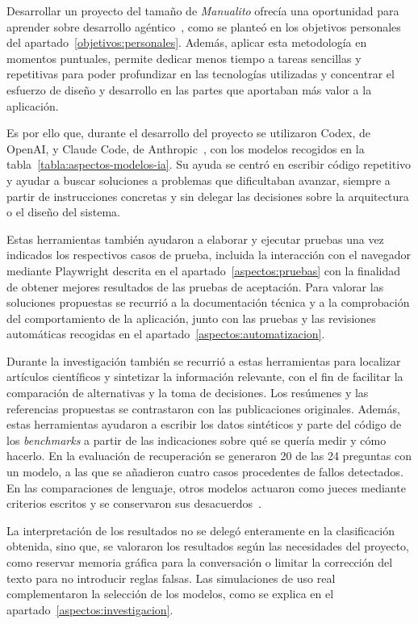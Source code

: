 Desarrollar un proyecto del tamaño de \textit{Manualito} ofrecía una
oportunidad para aprender sobre desarrollo agéntico~\cite{ibm_agentic_coding}, como se planteó en
los objetivos personales del apartado~\ref{objetivos:personales}. Además,
aplicar esta metodología en momentos puntuales, permite dedicar menos tiempo a tareas sencillas y repetitivas para poder
profundizar en las tecnologías utilizadas y concentrar el esfuerzo de
diseño y desarrollo en las partes que aportaban más valor a la aplicación.

Es por ello que, durante el desarrollo del proyecto se utilizaron Codex, de OpenAI,
y Claude Code, de Anthropic~\cite{claude_code_documentacion}, con los modelos
recogidos en la tabla~\ref{tabla:aspectos-modelos-ia}. Su ayuda se centró en
escribir código repetitivo y ayudar a buscar soluciones a problemas que dificultaban
avanzar, siempre a partir de instrucciones concretas y sin delegar las
decisiones sobre la arquitectura o el diseño del sistema.

Estas herramientas también ayudaron a elaborar y ejecutar pruebas una vez indicados
los respectivos casos de prueba, incluida
la interacción con el navegador mediante Playwright descrita en el
apartado~\ref{aspectos:pruebas} con la finalidad de obtener mejores resultados de las pruebas de
aceptación. Para valorar las soluciones propuestas se
recurrió a la documentación técnica y a la comprobación del comportamiento
de la aplicación, junto con las pruebas y las revisiones automáticas
recogidas en el apartado~\ref{aspectos:automatizacion}.

Durante la investigación también se recurrió a estas herramientas para
localizar artículos científicos y sintetizar la información relevante, con
el fin de facilitar la comparación de alternativas y la toma de decisiones.
Los resúmenes y las referencias propuestas se contrastaron con las
publicaciones originales. Además, estas herramientas ayudaron a escribir los datos sintéticos y
parte del código de los \textit{benchmarks} a partir de las indicaciones sobre qué
se quería medir y cómo hacerlo. En la evaluación de recuperación se generaron
20 de las 24 preguntas con un modelo, a las que se añadieron cuatro casos
procedentes de fallos detectados. En las comparaciones de lenguaje, otros
modelos actuaron como jueces mediante criterios escritos y se conservaron
sus desacuerdos~\cite{manualito_benchmarks}.

La interpretación de los resultados no se delegó enteramente en la clasificación obtenida, sino que, se valoraron
los resultados según las necesidades del proyecto, como reservar memoria
gráfica para la conversación o limitar la corrección del texto para no
introducir reglas falsas. Las simulaciones de uso real complementaron la
selección de los modelos, como se explica en el
apartado~\ref{aspectos:investigacion}.

